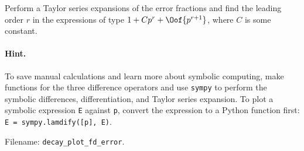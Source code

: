 \documentclass[graybox,sectrefs,envcountresetchap,open=right,final]{svmonodo}
\newenvironment{doconceexercise}{}{}
\begin{document}
\begin{doconceexercise}
Perform a Taylor series expansions of the error fractions and find
the leading order $r$ in the expressions of type
$1 + Cp^r + \Oof{p^{r+1}}$, where $C$ is some constant.


\paragraph{Hint.}
To save manual calculations and learn more about symbolic computing,
make functions for the three difference operators and use \texttt{sympy}
to perform the symbolic differences, differentiation, and Taylor series
expansion. To plot a symbolic expression \texttt{E} against \texttt{p}, convert the
expression to a Python function first: \texttt{E = sympy.lamdify([p], E)}.



\noindent Filename: \Verb!decay_plot_fd_error!.

\end{doconceexercise}
\end{document}
